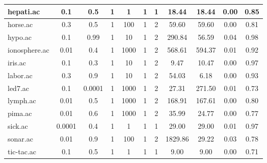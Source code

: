 \begin{table}[htbp]
\begin{tabular}{|l|c|c|c|c|c|c||c|c|c|c|}
		\hline
		hepati.ac      & 0.1      & 0.5         & 1              & 1                   & 1             & 1             & 18.44          & 18.44          & 0.00           & 0.85           \\
		\hline
		horse.ac       & 0.3      & 0.5         & 1              & 100                 & 1             & 2             & 59.60          & 59.60          & 0.00           & 0.81           \\
		\hline
		hypo.ac        & 0.1      & 0.99        & 1              & 10                  & 1             & 2             & 290.84         & 56.59          & 0.04           & 0.98           \\
		\hline
		ionosphere.ac  & 0.01     & 0.4         & 1              & 1000                & 1             & 2             & 568.61         & 594.37         & 0.01           & 0.92           \\
		\hline
		iris.ac        & 0.1      & 0.3         & 1              & 10                  & 1             & 2             & 9.47           & 10.47          & 0.00           & 0.97           \\
		\hline
		labor.ac       & 0.3      & 0.9         & 1              & 10                  & 1             & 2             & 54.03          & 6.18           & 0.00           & 0.93           \\
		\hline
		led7.ac        & 0.1      & 0.0001      & 1              & 1000                & 1             & 2             & 27.31          & 271.50         & 0.01           & 0.73           \\
		\hline
		lymph.ac       & 0.01     & 0.5         & 1              & 1000                & 1             & 2             & 168.91         & 167.61         & 0.00           & 0.80           \\
		\hline
		pima.ac        & 0.01     & 0.6         & 1              & 1000                & 1             & 2             & 35.99          & 24.77          & 0.00           & 0.77           \\
		\hline
		sick.ac        & 0.0001   & 0.4         & 1              & 1                   & 1             & 1             & 29.00          & 29.00          & 0.01           & 0.97           \\
		\hline
		sonar.ac       & 0.01     & 0.9         & 1              & 100                 & 1             & 2             & 1829.86        & 29.22          & 0.03           & 0.78           \\
		\hline
		tic-tac.ac     & 0.1      & 0.5         & 1              & 1                   & 1             & 1             & 9.00           & 9.00           & 0.00           & 0.71           \\

\end{tabular}
\end{table}
